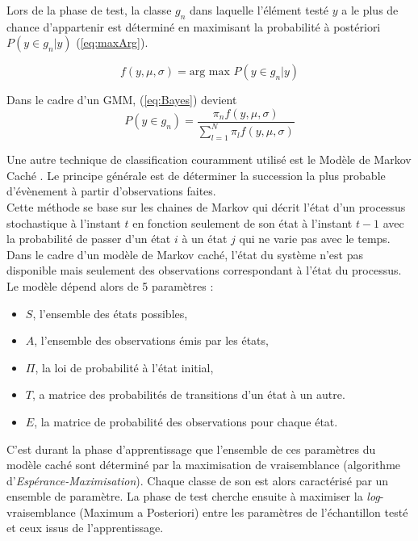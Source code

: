 Lors de la phase de test, la classe $g_n$ dans laquelle l'élément testé $y$ a le plus de chance d'appartenir est déterminé en maximisant la probabilité à postériori $P(y\in g_n\vert y)$ (\ref{eq:maxArg}).

\begin{equation}\label{eq:maxArg}
f(y,\mu, \sigma) = \text{arg max } P(y\in g_n\vert y)
\end{equation}

Dans le cadre d'un GMM, (\ref{eq:Bayes}) devient 
\begin{equation}
P(y \in g_n) = \frac{\pi_n f(y,\mu,\sigma)}{\sum_{l = 1}^N \pi_l f(y,\mu, \sigma)}
\end{equation}

Une autre technique de classification couramment utilisé est le Modèle de Markov Caché \cite{Rabiner}. Le principe générale est de déterminer la succession la plus probable d'évènement à partir d'observations faites.\\
Cette méthode se base sur les chaines de Markov qui décrit l'état d'un processus stochastique à l'instant $t$ en fonction seulement de son état à l'instant $t-1$ avec la probabilité de passer d'un état $i$ à un état $j$ qui ne varie pas avec le temps.\\

Dans le cadre d'un modèle de Markov caché, l'état du système n'est pas disponible mais seulement des observations correspondant à l'état du processus. Le modèle dépend alors de 5 paramètres : 

\begin{itemize}
\item $S$, l'ensemble des états possibles,
\item $A$, l'ensemble des observations émis par les états,
\item $\Pi$, la loi de probabilité à l'état initial,
\item $T$, a matrice des probabilités de transitions d'un état à un autre.
\item $E$, la matrice de probabilité des observations pour chaque état.\\
\end{itemize}

C'est durant la phase d'apprentissage que l'ensemble de ces paramètres du modèle caché sont déterminé par la maximisation de vraisemblance (algorithme d'\textit{Espérance-Maximisation}). Chaque classe de son est alors caractérisé par un ensemble de paramètre. La phase de test cherche ensuite à maximiser la \textit{log}-vraisemblance (Maximum a Posteriori) entre les paramètres de l'échantillon testé et ceux issus de l'apprentissage.

